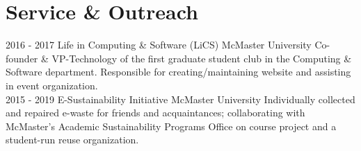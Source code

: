 \documentclass[letterpaper]{twentysecondcv} %
\begin{document}
\vspace{-0.5em}
\section{Service \& Outreach}
\vspace{-0.5em}
\begin{twenty}
  \twentyitem
  {2016 -}
  {2017}
  {Life in Computing \& Software (LiCS)}
  {McMaster University}
  {}
  {Co-founder \& VP-Technology of the first graduate student club in the Computing \& Software department. Responsible for creating/maintaining website and assisting in event organization.}
\\
\twentyitem
{2015 -}
{2019}
{E-Sustainability Initiative}
{McMaster University}
{}
{Individually collected and repaired e-waste for friends and acquaintances; collaborating with McMaster's Academic Sustainability Programs Office on course project and a student-run reuse organization.}
\end{twenty}
\end{document}
